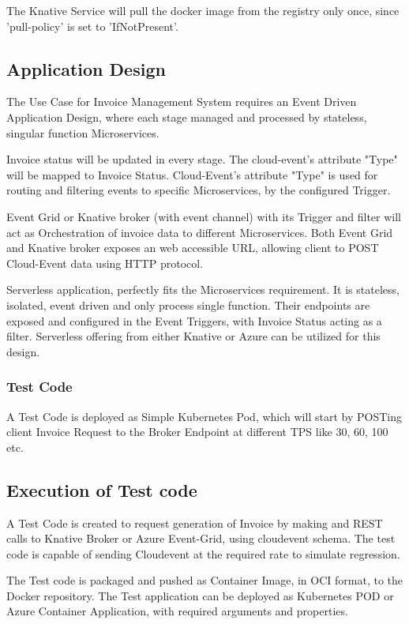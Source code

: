 \documentclass{article}
\begin{document}
\begin{flushleft}
The Knative Service will pull the docker image from the registry only once, since 'pull-policy' is set to 'IfNotPresent'. 

\subsection{Application Design}
The Use Case for Invoice Management System requires an Event Driven Application Design, where each stage managed and processed by stateless, singular function Microservices. 
 \par
Invoice status will be updated in every stage. The cloud-event's attribute "Type" will be mapped to Invoice Status. Cloud-Event's attribute "Type" is used for routing and filtering events to specific Microservices, by the configured Trigger.
\par
Event Grid or Knative broker (with event channel) with its Trigger and filter will act as Orchestration of invoice data to different Microservices. Both Event Grid and Knative broker exposes an web accessible URL, allowing client to POST Cloud-Event data using HTTP protocol.
\par
Serverless application, perfectly fits the Microservices requirement. It is stateless, isolated, event driven and only process single function. Their endpoints are exposed and configured in the Event Triggers, with Invoice Status acting as a filter. 
\hfill\break
Serverless offering from either Knative or Azure can be utilized for this design.

\subsubsection{Test Code}
A Test Code is deployed as Simple Kubernetes Pod, which will start by POSTing client Invoice Request to the Broker Endpoint at different TPS like 30, 60, 100 etc.

\subsection{Execution of Test code}
A Test Code is created to request generation of Invoice by making and REST calls to Knative Broker or Azure Event-Grid, using cloudevent schema. The test code is capable of sending Cloudevent at the required rate to simulate regression. 
\par
The Test code is packaged and pushed as Container Image, in OCI format, to the Docker repository. The Test application can be deployed as Kubernetes POD or Azure Container Application, with required arguments and properties.
\end{flushleft}
\pagebreak
\end{document}
